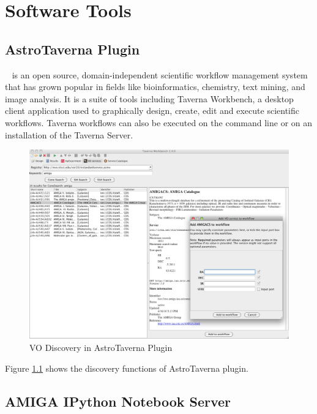 \chapter{Software Tools}\label{ch:tools}

\section{AstroTaverna Plugin}
~\citep{Wolstencroft2013} is an open source, domain-independent scientific workflow management system that has grown popular in fields like bioinformatics, chemistry, text mining, and image analysis. It is a suite of tools including Taverna Workbench, a desktop client application used to graphically design, create, edit and execute scientific workflows. Taverna workflows can also be executed on the command line or on an installation of the Taverna Server.

\begin{figure}[h!]
\begin{center}

  \includegraphics{gfx/VODiscovery.jpg}
  \caption{VO Discovery in AstroTaverna Plugin}
  \label{fig:vodiscovery}
\end{center}
\end{figure}

Figure \ref{fig:vodiscovery} shows the discovery functions of AstroTaverna plugin.

\section{AMIGA IPython Notebook Server}

